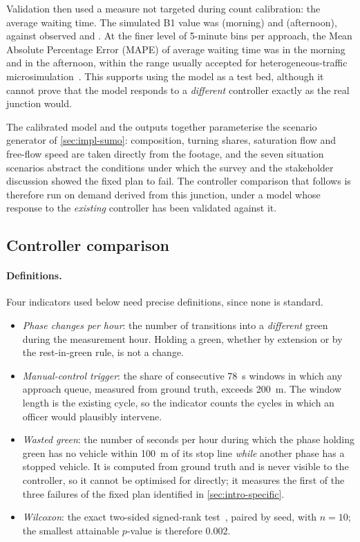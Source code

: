 Validation then used a measure not targeted during count calibration: the average waiting time. The simulated B1 value was  (morning) and  (afternoon), against observed  and . At the finer level of 5-minute bins per approach, the Mean Absolute Percentage Error (MAPE) of average waiting time was  in the morning and  in the afternoon, within the range usually accepted for heterogeneous-traffic microsimulation~\cite{mathew2010calibration}. This supports using the model as a test bed, although it cannot prove that the model responds to a \emph{different} controller exactly as the real junction would.

The calibrated model and the \dtx{} outputs together parameterise the scenario generator of \cref{sec:impl-sumo}: composition, turning shares, saturation flow and free-flow speed are taken directly from the footage, and the seven situation scenarios abstract the conditions under which the survey and the stakeholder discussion showed the fixed plan to fail. The controller comparison that follows is therefore run on demand derived from this junction, under a model whose response to the \emph{existing} controller has been validated against it.

\subsection{Controller comparison}\label{sec:eval-results}

\paragraph{Definitions.} Four indicators used below need precise definitions, since none is standard.
\begin{itemize}[noitemsep,leftmargin=*]
  \item \emph{Phase changes per hour}: the number of transitions into a \emph{different} green during the
        measurement hour. Holding a green, whether by extension or by the rest-in-green rule, is not a change.
  \item \emph{Manual-control trigger}: the share of consecutive 78~s windows in which any approach queue,
        measured from \sumo{} ground truth, exceeds 200~m. The window length is the existing cycle, so the
        indicator counts the cycles in which an officer would plausibly intervene.
  \item \emph{Wasted green}: the number of seconds per hour during which the phase holding green has no
        vehicle within 100~m of its stop line \emph{while} another phase has a stopped vehicle. It is
        computed from \sumo{} ground truth and is never visible to the controller, so it cannot be optimised
        for directly; it measures the first of the three failures of the fixed plan identified in
        \cref{sec:intro-specific}.
  \item \emph{Wilcoxon}: the exact two-sided signed-rank test~\cite{wilcoxon1945}, paired by seed, with
        $n = 10$; the smallest attainable $p$-value is therefore 0.002.
\end{itemize}

